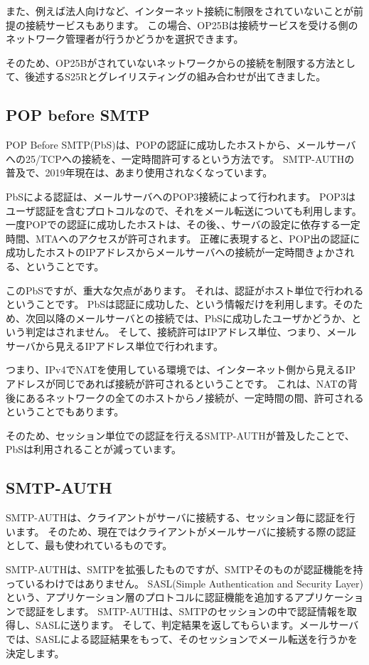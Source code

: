 また、例えば法人向けなど、インターネット接続に制限をされていないことが前提の接続サービスもあります。
この場合、OP25Bは接続サービスを受ける側のネットワーク管理者が行うかどうかを選択できます。

そのため、OP25Bがされていないネットワークからの接続を制限する方法として、後述するS25Rとグレイリスティングの組み合わせが出てきました。

\subsection{POP before SMTP}

POP Before SMTP(PbS)は、POPの認証に成功したホストから、メールサーバへの25/TCPへの接続を、一定時間許可するという方法です。
SMTP-AUTHの普及で、2019年現在は、あまり使用されなくなっています。

PbSによる認証は、メールサーバへのPOP3接続によって行われます。
POP3はユーザ認証を含むプロトコルなので、それをメール転送についても利用します。
一度POPでの認証に成功したホストは、その後、、サーバの設定に依存する一定時間、MTAへのアクセスが許可されます。
正確に表現すると、POP出の認証に成功したホストのIPアドレスからメールサーバへの接続が一定時間きょかされる、ということです。

このPbSですが、重大な欠点があります。
それは、認証がホスト単位で行われるということです。
PbSは認証に成功した、という情報だけを利用します。そのため、次回以降のメールサーバとの接続では、PbSに成功したユーザかどうか、という判定はされません。
そして、接続許可はIPアドレス単位、つまり、メールサーバから見えるIPアドレス単位で行われます。

つまり、IPv4でNATを使用している環境では、インターネット側から見えるIPアドレスが同じであれば接続が許可されるということです。
これは、NATの背後にあるネットワークの全てのホストからノ接続が、一定時間の間、許可されるということでもあります。

そのため、セッション単位での認証を行えるSMTP-AUTHが普及したことで、PbSは利用されることが減っています。

\subsection{SMTP-AUTH}

SMTP-AUTHは、クライアントがサーバに接続する、セッション毎に認証を行います。
そのため、現在ではクライアントがメールサーバに接続する際の認証として、最も使われているものです。

SMTP-AUTHは、SMTPを拡張したものですが、SMTPそのものが認証機能を持っているわけではありません。
SASL(Simple Authentication and Security Layer)という、アプリケーション層のプロトコルに認証機能を追加するアプリケーションで認証をします。
SMTP-AUTHは、SMTPのセッションの中で認証情報を取得し、SASLに送ります。
そして、判定結果を返してもらいます。メールサーバでは、SASLによる認証結果をもって、そのセッションでメール転送を行うかを決定します。


